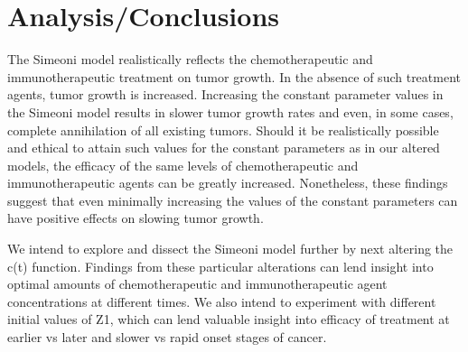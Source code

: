 \documentclass[11pt,reqno]{amsart}
\begin{document}
\section{Analysis/Conclusions}
The Simeoni model realistically reflects the chemotherapeutic and immunotherapeutic treatment on tumor growth. In the absence of such treatment agents, tumor growth is increased. Increasing the constant parameter values in the Simeoni model results in slower tumor growth rates and even, in some cases, complete annihilation of all existing tumors. Should it be realistically possible and ethical to attain such values for the constant parameters as in our altered models, the efficacy of the same levels of chemotherapeutic and immunotherapeutic agents can be greatly increased. Nonetheless, these findings suggest that even minimally increasing the values of the constant parameters can have positive effects on slowing tumor growth.


We intend to explore and dissect the Simeoni model further by next altering the c(t) function. Findings from these particular alterations can lend insight into optimal amounts of chemotherapeutic and immunotherapeutic agent concentrations at different times. We also intend to experiment with different initial values of Z1, which can lend valuable insight into efficacy of treatment at earlier vs later and slower vs rapid onset stages of cancer.







\FloatBarrier %
\newpage

{} %
\end{document}
